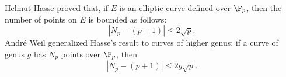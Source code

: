 \documentclass [preview, border = 20pt] {standalone}
\begin{document}
\pagecolor{black}
\color{white}
Helmut Hasse proved that, if $E$ is an elliptic curve defined over $\F_p$, then the number of points on $E$ is bounded as follows:
\[
  | N_p - (p+1) | \le 2\sqrt p.
\]
Andr\'e Weil generalized Hasse's result to curves of higher genus: if a curve of genus $g$ has $N_p$ points over $\F_p$, then
\[
  | N_p - (p+1) | \le 2g\sqrt p.
\]
\end{document}
